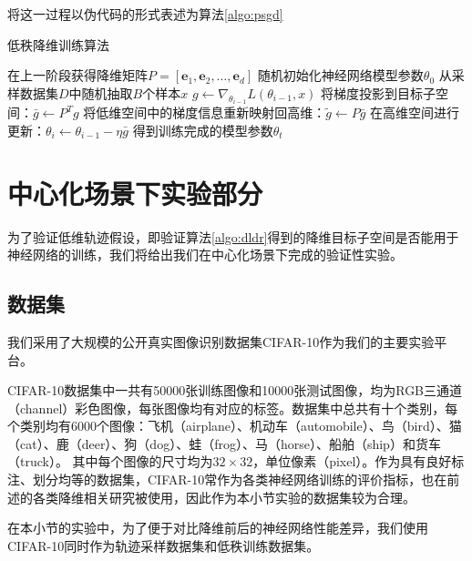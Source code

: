 将这一过程以伪代码的形式表述为算法\ref{algo:psgd}


\begin{algorithm}[htb]
    \caption{低秩降维训练算法}
    \label{algo:psgd}
    \small
    \SetAlgoLined
    在上一阶段获得降维矩阵$P = [\mathbf{e}_1, \mathbf{e}_2, \dots, \mathbf{e}_d]$\;
    随机初始化神经网络模型参数$\theta_0$\;
     {
         {
            从采样数据集$D$中随机抽取$B$个样本$x$\;
            $g \leftarrow \nabla_{\theta_{i - 1}} L(\theta_{i - 1}, x)$\;
            将梯度投影到目标子空间：$\bar{g} \leftarrow P^Tg $\;
            将低维空间中的梯度信息重新映射回高维：$\widetilde{g} \leftarrow P\bar{g}$\;
            在高维空间进行更新：$\theta_{i} \leftarrow \theta_{i - 1} - \eta \bar{g}$\;
        }
    }
    得到训练完成的模型参数$\theta_t$\;
  \end{algorithm}


\section{中心化场景下实验部分}

为了验证低维轨迹假设，即验证算法\ref{algo:dldr}得到的降维目标子空间是否能用于神经网络的训练，我们将给出我们在中心化场景下完成的验证性实验。


\subsection{数据集}

我们采用了大规模的公开真实图像识别数据集CIFAR-10\cite{krizhevsky2009learning}作为我们的主要实验平台。

CIFAR-10数据集中一共有50000张训练图像和10000张测试图像，均为RGB三通道（channel）彩色图像，每张图像均有对应的标签。数据集中总共有十个类别，每个类别均有6000个图像：飞机（airplane）、机动车（automobile）、鸟（bird）、猫（cat）、鹿（deer）、狗（dog）、蛙（frog）、马（horse）、船舶（ship）和货车（truck）。 其中每个图像的尺寸均为$32 \times 32$，单位像素（pixel）。作为具有良好标注、划分均等的数据集，CIFAR-10常作为各类神经网络训练的评价指标，也在前述的各类降维相关研究\cite{li2018measuring}被使用，因此作为本小节实验的数据集较为合理。

在本小节的实验中，为了便于对比降维前后的神经网络性能差异，我们使用CIFAR-10同时作为轨迹采样数据集和低秩训练数据集。

